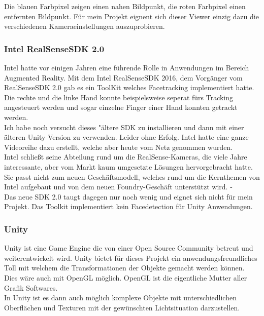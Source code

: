 Die blauen Farbpixel zeigen einen nahen Bildpunkt, die roten Farbpixel einen entfernten Bildpunkt. F\"ur mein Projekt eignent sich dieser Viewer einzig dazu die verschiedenen Kameraeinstellungen auszuprobieren.
			
\subsubsection{Intel RealSenseSDK 2.0}

Intel hatte vor einigen Jahren eine f\"uhrende Rolle in Anwendungen im Bereich Augmented Reality. Mit dem Intel RealSenseSDK 2016, dem Vorgänger vom RealSenseSDK 2.0 gab es ein ToolKit welches Facetracking implementiert hatte. Die rechte und die linke Hand konnte beispielsweise seperat fürs Tracking angesteuert werden und sogar einzelne Finger einer Hand konnten getrackt werden. \\Ich habe noch versucht dieses "\"altere SDK zu installieren und dann mit einer \"alteren Unity Version zu verwenden. Leider ohne Erfolg. Intel hatte eine ganze Videoreihe dazu erstellt, welche aber heute vom Netz genommen wurden.\\
Intel schließt seine Abteilung rund um die RealSense-Kameras, die viele Jahre interessante, aber vom Markt kaum umgesetzte Lösungen hervorgebracht hatte. Sie passt nicht zum neuen Geschäftsmodell, welches rund um die Kernthemen von Intel aufgebaut und von dem neuen Foundry-Geschäft unterstützt wird.
\cite{ComputerBase}- \\ Das neue SDK 2.0 taugt dagegen nur noch wenig und eignet sich nicht f\"ur mein Projekt. Das Toolkit implementiert kein Facedetection für Unity Anwendungen.			

\subsubsection{Unity}

Unity ist eine Game Engine die von einer Open Source Community betreut und weiterentwickelt wird. Unity bietet f\"ur dieses Projekt ein anwendungsfreundliches Toll mit welchem die Transformationen der Objekte gemacht werden k\"onnen. \\ Dies w\"are auch mit OpenGL m\"oglich. OpenGL ist die eigentliche Mutter aller Grafik Softwares. \\In Unity ist es dann auch m\"oglich komplexe Objekte mit unterschiedlichen Oberfl\"achen und Texturen mit der gew\"unschten Lichtsituation darzustellen. 
\cite{Unity}
			
